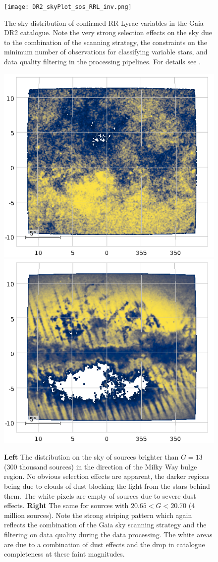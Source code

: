 \begin{figure}
    \centering
    \texttt{[image: DR2\_skyPlot\_sos\_RRL\_inv.png]}
    \caption{The sky distribution of confirmed RR Lyrae variables in the Gaia DR2 catalogue. Note the very strong selection effects on the sky due to the combination of the scanning strategy, the constraints on the minimum number of observations for classifying variable stars, and data quality filtering in the processing pipelines. For details see \cite{2018A&A...618A..30H}.}
    \label{fig:rrl}
\end{figure}

\begin{figure}
    \centering
    \includegraphics[width=0.5\linewidth]{img/BulgeRegionGlt13.png}\hfil
    \includegraphics[width=0.5\linewidth]{img/BulgeRegionG20p65to20p70.png}
    \caption{\textbf{Left} The distribution on the sky of sources brighter than $G=13$ (300 thousand sources) in the direction of the Milky Way bulge region. No obvious selection effects are apparent, the darker regions being due to clouds of dust blocking the light from the stars behind them. The white pixels are empty of sources due to severe dust effects. \textbf{Right} The same for sources with $20.65<G<20.70$ (4 million sources). Note the strong striping pattern which again reflects the combination of the Gaia sky scanning strategy and the filtering on data quality during the data processing. The white areas are due to a combination of dust effects and the drop in catalogue completeness at these faint magnitudes.}
    \label{fig:bulge}
\end{figure}

